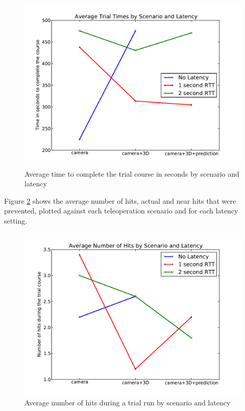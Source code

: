 \documentclass[12pt]{report}
\begin{document}
\begin{figure}[ht]
  \centering
  \includegraphics[width=6.5in,keepaspectratio]{trial_times.pdf}
  \caption{Average time to complete the trial course in seconds by scenario and latency}
  \label{fig:trial_times}
\end{figure}

Figure \ref{fig:trial_hits} shows the average number of hits, actual and near hits that were prevented, plotted against each teleoperation scenario and for each latency setting.

\begin{figure}[ht]
  \centering
  \includegraphics[width=6.5in,keepaspectratio]{trial_hits.pdf}
  \caption{Average number of hits during a trial run by scenario and latency}
  \label{fig:trial_hits}
\end{figure}
\end{document}

